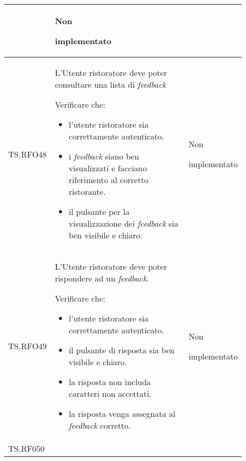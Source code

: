 \begin{longtable}{|p{0.10\linewidth}|p{0.70\linewidth}|p{0.12\linewidth}|}
\begin{itemize}
	\end{itemize}                                                      &
	Non \par implementato                                                                                                                                                   \\
	\hline
	TS.RFO48                                                                                                                        &
	L’Utente ristoratore deve poter consultare una lista di \textit{feedback} \par
	Verificare che:
	\begin{itemize}
		\item l'utente ristoratore sia correttamente autenticato.
		\item i \textit{feedback} siano ben visualizzati e facciano riferimento al corretto ristorante.
		\item il pulsante per la visualizzazione dei \textit{feedback} sia ben visibile e chiaro.
	\end{itemize}                                 &
	Non \par implementato                                                                                                                                                   \\
	\hline
	TS.RFO49                                                                                                                        &
	L’Utente ristoratore deve poter rispondere ad un \textit{feedback}. \par
	Verificare che:
	\begin{itemize}
		\item l'utente ristoratore sia correttamente autenticato.
		\item il pulsante di risposta sia ben visibile e chiaro.
		\item la risposta non includa caratteri non accettati.
		\item la risposta venga assegnata al \textit{feedback} corretto.
	\end{itemize}                                                                &
	Non \par implementato                                                                                                                                                   \\
	\hline
	TS.RF050                                                                                                                        &

\end{longtable}
